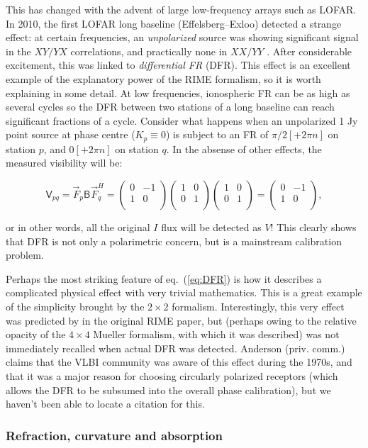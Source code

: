 \documentclass[]{aa}
\newcommand{\matrixtt}[4]{\left( \begin{array}{cc}#1&#2\\#3&#4\\\end{array} \right)}
\newcommand{\herm}{H}
\newcommand{\jones}[2]{\vec {#1}_{#2}}
\newcommand{\jonesT}[2]{\vec {#1}^{\herm}_{#2}}
\newcommand{\coh}[2]{\mathsf{{#1}}_{{#2}}}
\begin{document}
This has changed with the advent of large low-frequency arrays such as LOFAR. In 2010, the first LOFAR long baseline (Effelsberg--Exloo) detected a strange effect: at certain frequencies, an \emph{unpolarized} source was showing significant signal in the $XY/YX$ correlations, and practically none in $XX/YY$ \citep{Wucknitz:DFR}. After considerable excitement, this was linked to \emph{differential FR} (DFR). This effect is an excellent example of the explanatory power of the RIME formalism, so it is worth explaining in some detail. At low frequencies, ionospheric FR can be as high as several cycles \citep[e.g. 15 cycles at 100 MHz, see][Sect.~10.3]{tms} so the DFR between two stations of a long baseline can reach significant fractions of a cycle. Consider what happens when an unpolarized 1 Jy point source at phase centre ($K_p\equiv0$) is subject to an FR of $\pi/2[+2\pi n]$ on station $p$, and $0[+2\pi n]$ on station $q$. In the absense of other effects, the measured visibility will be:

\begin{equation}\label{eq:DFR}
\coh{V}{pq} = \jones{F}{p}\coh{B}{}\jonesT{F}{q} = \matrixtt{0}{-1}{1}{0} \matrixtt{1}{0}{0}{1} \matrixtt{1}{0}{0}{1} = \matrixtt{0}{-1}{1}{0},
\end{equation}

or in other words, all the original $I$ flux will be detected as $V$! This clearly shows that DFR is not only a polarimetric concern, but is a mainstream calibration problem.

Perhaps the most striking feature of eq.~(\ref{eq:DFR}) is how it describes a complicated physical effect with very trivial mathematics. This is a great example of the simplicity brought by the $2\times2$ formalism. Interestingly, this very effect was predicted by \citet{ME1} in the original RIME paper, but (perhaps owing to the relative opacity of the $4\times4$ Mueller formalism, with which it was described) was not immediately recalled when actual DFR was detected. Anderson (priv. comm.) claims that the VLBI community was aware of this effect during the 1970s, and that it was a major reason for choosing circularly polarized receptors (which allows the DFR to be subsumed into the overall phase calibration), but we haven't been able to locate a citation for this.

\subsubsection{Refraction, curvature and absorption}
\end{document}

